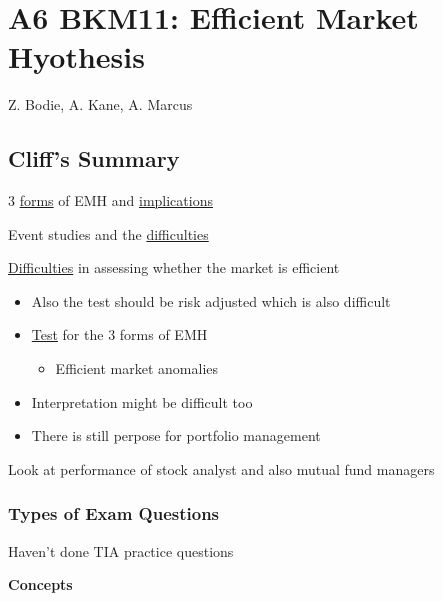 \documentclass[]{book}
\providecommand{\tightlist}{%
  \setlength{\itemsep}{0pt}\setlength{\parskip}{0pt}}
\theoremstyle{definition}
\theoremstyle{definition}
\theoremstyle{remark}
\begin{document}
\chapter{A6 BKM11: Efficient Market
Hyothesis}\label{a6-bkm11-efficient-market-hyothesis}

Z. Bodie, A. Kane, A. Marcus

\section{Cliff's Summary}\label{cliffs-summary-5}

3 \protect\hyperlink{EMH-forms}{forms} of EMH and
\protect\hyperlink{EMH-implications}{implications}

Event studies and the \protect\hyperlink{event-diff}{difficulties}

\protect\hyperlink{efficient-diff}{Difficulties} in assessing whether
the market is efficient

\begin{itemize}
\item
  Also the test should be risk adjusted which is also difficult
\item
  \protect\hyperlink{EMH-3-forms-test}{Test} for the 3 forms of EMH

  \begin{itemize}
  \tightlist
  \item
    Efficient market anomalies
  \end{itemize}
\item
  Interpretation might be difficult too
\item
  There is still perpose for portfolio management
\end{itemize}

Look at performance of stock analyst and also mutual fund managers

\subsection{Types of Exam Questions}\label{types-of-exam-questions-5}

{Haven't done TIA practice questions}

\textbf{Concepts}
\end{document}
